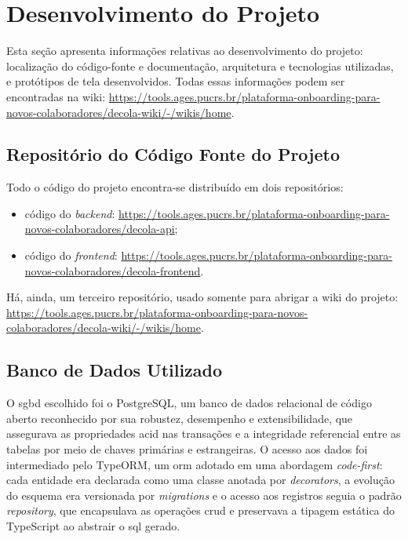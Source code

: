 \section[Desenvolvimento do Projeto]{Desenvolvimento do Projeto}

Esta seção apresenta informações relativas ao desenvolvimento do projeto: localização do código-fonte e documentação, arquitetura e tecnologias utilizadas, e protótipos de tela desenvolvidos. Todas essas informações podem ser encontradas na wiki: \url{https://tools.ages.pucrs.br/plataforma-onboarding-para-novos-colaboradores/decola-wiki/-/wikis/home}.

\subsection{Repositório do Código Fonte do Projeto}
  Todo o código do projeto encontra-se distribuído em dois repositórios:
\begin{itemize}
    \item código do \textit{backend}: \url{https://tools.ages.pucrs.br/plataforma-onboarding-para-novos-colaboradores/decola-api};
    \item código do \textit{frontend}: \url{https://tools.ages.pucrs.br/plataforma-onboarding-para-novos-colaboradores/decola-frontend}.
\end{itemize}

Há, ainda, um terceiro repositório, usado somente para abrigar a wiki do projeto: \url{https://tools.ages.pucrs.br/plataforma-onboarding-para-novos-colaboradores/decola-wiki/-/wikis/home}.

\subsection{Banco de Dados Utilizado}
  O \ac{sgbd} escolhido foi o PostgreSQL, um banco de dados relacional de código aberto reconhecido por sua robustez, desempenho e extensibilidade, que assegurava as propriedades \ac{acid} nas transações e a integridade referencial entre as tabelas por meio de chaves primárias e estrangeiras. O acesso aos dados foi intermediado pelo TypeORM, um \ac{orm} adotado em uma abordagem \textit{code-first}: cada entidade era declarada como uma classe anotada por \textit{decorators}, a evolução do esquema era versionada por \textit{migrations} e o acesso aos registros seguia o padrão \textit{repository}, que encapsulava as operações \ac{crud} e preservava a tipagem estática do TypeScript ao abstrair o \ac{sql} gerado.

